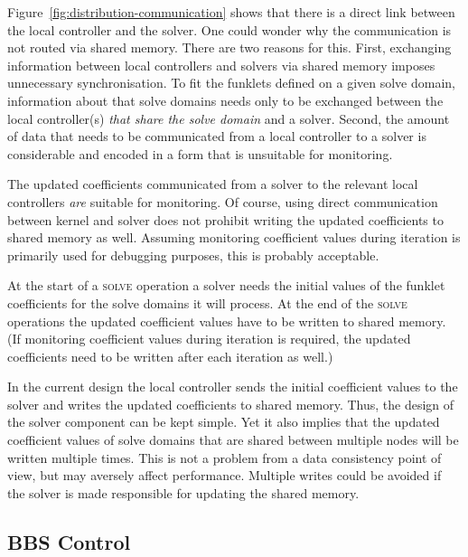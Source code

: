 \documentclass[10pt]{lofar}
\newcommand{\solve}{\textsc{solve}\xspace}
\begin{document}
Figure~\ref{fig:distribution-communication} shows that there is a direct link
between the local controller and the solver. One could wonder why the
communication is not routed via shared memory. There are two reasons for this.
First, exchanging information between local controllers and solvers via shared
memory imposes unnecessary synchronisation. To fit the funklets defined on a
given solve domain, information about that solve domains needs only to be
exchanged between the local controller(s) \emph{that share the solve domain} and
a solver. Second, the amount of data that needs to be communicated from a local
controller to a solver is considerable and encoded in a form that is unsuitable
for monitoring.

The updated coefficients communicated from a solver to the relevant local
controllers \emph{are} suitable for monitoring. Of course, using direct
communication between kernel and solver does not prohibit writing the updated
coefficients to shared memory as well. Assuming monitoring coefficient values
during iteration is primarily used for debugging purposes, this is probably
acceptable.

At the start of a \solve operation a solver needs the initial values of the
funklet coefficients for the solve domains it will process. At the end of the
\solve operations the updated coefficient values have to be written to shared
memory. (If monitoring coefficient values during iteration is required, the
updated coefficients need to be written after each iteration as well.)

In the current design the local controller sends the initial coefficient values
to the solver and writes the updated coefficients to shared memory. Thus, the
design of the solver component can be kept simple. Yet it also implies that the
updated coefficient values of solve domains that are shared between multiple
nodes will be written multiple times. This is not a problem from a data
consistency point of view, but may aversely affect performance. Multiple writes
could be avoided if the solver is made responsible for updating the shared
memory.

\subsection{BBS Control}
\label{subsec:design-control}
\end{document}
